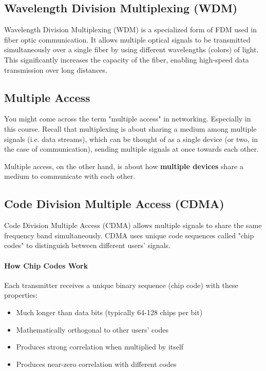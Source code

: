 \subsection{Wavelength Division Multiplexing (WDM)}
\label{subsec:wdm}

Wavelength Division Multiplexing (WDM) is a specialized form of FDM used in fiber optic communication. It allows multiple optical signals to be transmitted simultaneously over a single fiber by using different wavelengths (colors) of light. This significantly increases the capacity of the fiber, enabling high-speed data transmission over long distances.


\subsection{Multiple Access}
You might come across the term "multiple access" in networking. Especially in this course. Recall that multiplexing is about sharing a medium among multiple signals (i.e. data streams), which can be thought of as a single device (or two, in the case of communication), sending multiple signals at once towards each other.

\begin{importantblock}
    Multiple access, on the other hand, is about how \textbf{multiple devices} share a medium to communicate with each other.
\end{importantblock}

\subsection{Code Division Multiple Access (CDMA)}
\label{subsec:cdma}
Code Division Multiple Access (CDMA) allows multiple signals to share the same frequency band simultaneously. CDMA uses unique code sequences called "chip codes" to distinguish between different users' signals.

\paragraph{How Chip Codes Work}


Each transmitter receives a unique binary sequence (chip code) with these properties:
\begin{itemize}
    \item Much longer than data bits (typically 64-128 chips per bit)
    \item Mathematically orthogonal to other users' codes
    \item Produces strong correlation when multiplied by itself
    \item Produces near-zero correlation with different codes
\end{itemize}

